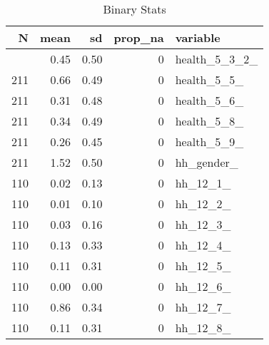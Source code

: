 \begin{table}[!t]
\caption*{
{\large Binary Stats}
} 
\fontsize{12.0pt}{14.4pt}\selectfont
\begin{tabular*}{\linewidth}{@{\extracolsep{\fill}}rrrrl}
\toprule
N & mean & sd & prop\_na & variable \\ 
\midrule\addlinespace[2.5pt]
118 & 0.45 & 0.50 & 0 & health\_5\_3\_2\_ \\ 
211 & 0.66 & 0.49 & 0 & health\_5\_5\_ \\ 
211 & 0.31 & 0.48 & 0 & health\_5\_6\_ \\ 
211 & 0.34 & 0.49 & 0 & health\_5\_8\_ \\ 
211 & 0.26 & 0.45 & 0 & health\_5\_9\_ \\ 
211 & 1.52 & 0.50 & 0 & hh\_gender\_ \\ 
110 & 0.02 & 0.13 & 0 & hh\_12\_1\_ \\ 
110 & 0.01 & 0.10 & 0 & hh\_12\_2\_ \\ 
110 & 0.03 & 0.16 & 0 & hh\_12\_3\_ \\ 
110 & 0.13 & 0.33 & 0 & hh\_12\_4\_ \\ 
110 & 0.11 & 0.31 & 0 & hh\_12\_5\_ \\ 
110 & 0.00 & 0.00 & 0 & hh\_12\_6\_ \\ 
110 & 0.86 & 0.34 & 0 & hh\_12\_7\_ \\ 
110 & 0.11 & 0.31 & 0 & hh\_12\_8\_ \\ 
\bottomrule
\end{tabular*}
\end{table}

